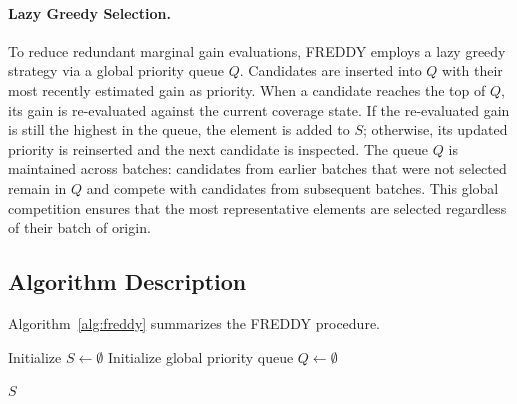 \documentclass{article}
\begin{document}
\paragraph{Lazy Greedy Selection.}
To reduce redundant marginal gain evaluations, FREDDY employs a lazy greedy
strategy via a global priority queue $Q$.
Candidates are inserted into $Q$ with their most recently estimated gain as priority.
When a candidate reaches the top of $Q$, its gain is re-evaluated against the
current coverage state.
If the re-evaluated gain is still the highest in the queue, the element is added to
$S$; otherwise, its updated priority is reinserted and the next candidate is
inspected.
The queue $Q$ is maintained across batches: candidates from earlier batches that
were not selected remain in $Q$ and compete with candidates from subsequent batches.
This global competition ensures that the most representative elements are selected
regardless of their batch of origin.

\subsection{Algorithm Description}

Algorithm~\ref{alg:freddy} summarizes the FREDDY procedure.

\begin{algorithm}[t]
\caption{FREDDY: Batch-Local Greedy Coreset Selection}
\label{alg:freddy}

Initialize $S \leftarrow \emptyset$\;
Initialize global priority queue $Q \leftarrow \emptyset$\;


\Return $S$\;
\end{algorithm}
\end{document}

